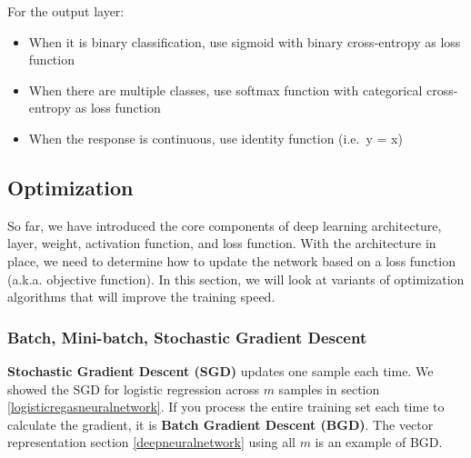 \documentclass[12pt,]{krantz}
\providecommand{\tightlist}{%
  \setlength{\itemsep}{0pt}\setlength{\parskip}{0pt}}
\begin{document}
For the output layer:

\begin{itemize}
\tightlist
\item
  When it is binary classification, use sigmoid with binary cross-entropy as loss function
\item
  When there are multiple classes, use softmax function with categorical cross-entropy as loss function
\item
  When the response is continuous, use identity function (i.e.~y = x)
\end{itemize}

\hypertarget{optimization}{%
\subsection{Optimization}\label{optimization}}

So far, we have introduced the core components of deep learning architecture, layer, weight, activation function, and loss function. With the architecture in place, we need to determine how to update the network based on a loss function (a.k.a. objective function). In this section, we will look at variants of optimization algorithms that will improve the training speed.

\hypertarget{batch-mini-batch-stochastic-gradient-descent}{%
\subsubsection{Batch, Mini-batch, Stochastic Gradient Descent}\label{batch-mini-batch-stochastic-gradient-descent}}

\textbf{Stochastic Gradient Descent (SGD)} updates one sample each time. We showed the SGD for logistic regression across \(m\) samples in section \ref{logisticregasneuralnetwork}. If you process the entire training set each time to calculate the gradient, it is \textbf{Batch Gradient Descent (BGD)}. The vector representation section \ref{deepneuralnetwork} using all \(m\) is an example of BGD.
\end{document}
